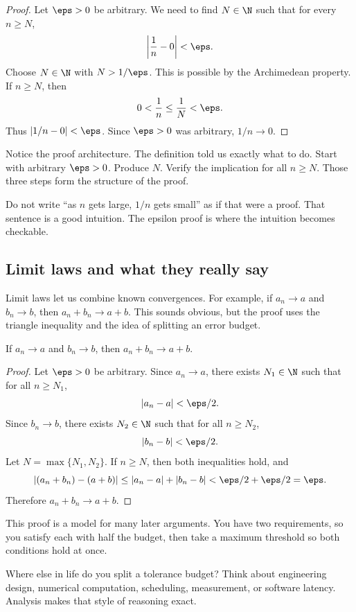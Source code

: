 \begin{proof}
Let $\eps>0$ be arbitrary. We need to find $N\in\N$ such that for every
$n\geq N$,
\[
\left|\frac1n-0\right|<\eps.
\]
Choose $N\in\N$ with $N>1/\eps$. This is possible by the Archimedean property.
If $n\geq N$, then
\[
0<\frac1n\leq\frac1N<\eps.
\]
Thus $|1/n-0|<\eps$. Since $\eps>0$ was arbitrary, $1/n\to 0$.
\end{proof}

Notice the proof architecture. The definition told us exactly what to do. Start
with arbitrary $\eps>0$. Produce $N$. Verify the implication for all $n\geq N$.
Those three steps form the structure of the proof.

\begin{trapbox}
Do not write ``as $n$ gets large, $1/n$ gets small'' as if that were a proof.
That sentence is a good intuition. The epsilon proof is where the intuition
becomes checkable.
\end{trapbox}

\subsection{Limit laws and what they really say}

Limit laws let us combine known convergences. For example, if $a_n\to a$ and
$b_n\to b$, then $a_n+b_n\to a+b$. This sounds obvious, but the proof uses the
triangle inequality and the idea of splitting an error budget.

\begin{theorem}
If $a_n\to a$ and $b_n\to b$, then $a_n+b_n\to a+b$.
\end{theorem}

\begin{proof}
Let $\eps>0$ be arbitrary. Since $a_n\to a$, there exists $N_1\in\N$ such that
for all $n\geq N_1$,
\[
|a_n-a|<\eps/2.
\]
Since $b_n\to b$, there exists $N_2\in\N$ such that for all $n\geq N_2$,
\[
|b_n-b|<\eps/2.
\]
Let $N=\max\{N_1,N_2\}$. If $n\geq N$, then both inequalities hold, and
\[
|(a_n+b_n)-(a+b)|\leq |a_n-a|+|b_n-b|<\eps/2+\eps/2=\eps.
\]
Therefore $a_n+b_n\to a+b$.
\end{proof}

This proof is a model for many later arguments. You have two requirements, so
you satisfy each with half the budget, then take a maximum threshold so both
conditions hold at once.

\begin{walkbox}
Where else in life do you split a tolerance budget? Think about engineering
design, numerical computation, scheduling, measurement, or software latency.
Analysis makes that style of reasoning exact.
\end{walkbox}

